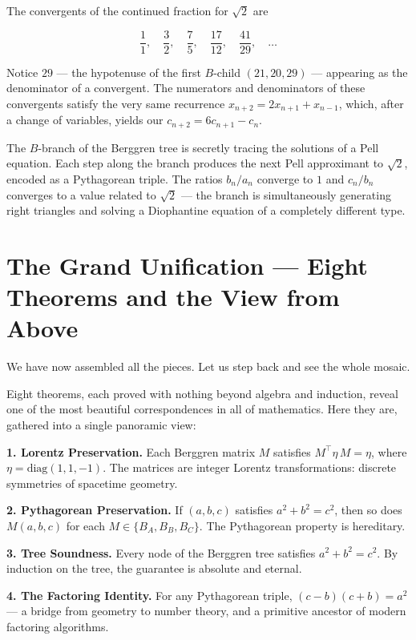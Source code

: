 \documentclass[11pt,twoside,openright]{book}
\theoremstyle{definition}
\theoremstyle{remark}
\begin{document}
The convergents of the continued fraction for $\sqrt{2}$ are

\[\frac{1}{1}, \quad \frac{3}{2}, \quad \frac{7}{5}, \quad \frac{17}{12}, \quad \frac{41}{29}, \quad \ldots\]

Notice $29$ --- the hypotenuse of the first $B$-child $(21, 20, 29)$ --- appearing as the denominator of a convergent. The numerators and denominators of these convergents satisfy the very same recurrence $x_{n+2} = 2x_{n+1} + x_{n-1}$, which, after a change of variables, yields our $c_{n+2} = 6c_{n+1} - c_n$.

The $B$-branch of the Berggren tree is secretly tracing the solutions of a Pell equation. Each step along the branch produces the next Pell approximant to $\sqrt{2}$, encoded as a Pythagorean triple. The ratios $b_n / a_n$ converge to $1$ and $c_n / b_n$ converges to a value related to $\sqrt{2}$ --- the branch is simultaneously generating right triangles and solving a Diophantine equation of a completely different type.




\section{The Grand Unification --- Eight Theorems and the View from Above}

We have now assembled all the pieces. Let us step back and see the whole mosaic.

Eight theorems, each proved with nothing beyond algebra and induction, reveal one of the most beautiful correspondences in all of mathematics. Here they are, gathered into a single panoramic view:

\textbf{1. Lorentz Preservation.} Each Berggren matrix $M$ satisfies $M^\top \eta\, M = \eta$, where $\eta = \mathrm{diag}(1, 1, -1)$. The matrices are integer Lorentz transformations: discrete symmetries of spacetime geometry.

\textbf{2. Pythagorean Preservation.} If $(a, b, c)$ satisfies $a^2 + b^2 = c^2$, then so does $M(a, b, c)$ for each $M \in \{B_A, B_B, B_C\}$. The Pythagorean property is hereditary.

\textbf{3. Tree Soundness.} Every node of the Berggren tree satisfies $a^2 + b^2 = c^2$. By induction on the tree, the guarantee is absolute and eternal.

\textbf{4. The Factoring Identity.} For any Pythagorean triple, $(c - b)(c + b) = a^2$ --- a bridge from geometry to number theory, and a primitive ancestor of modern factoring algorithms.
\end{document}

